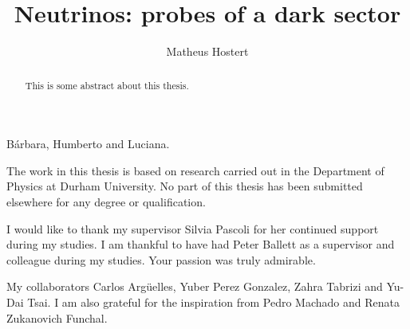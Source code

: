\documentclass[twoside,openright,frontopenright]{ip3thesis}
\begin{document}
\title{Neutrinos: probes of a dark sector}
\subtitle{}
\author{Matheus Hostert}
\maketitlepage*

\begin{abstract}
%
	This is some abstract about this thesis.
%
\end{abstract}


\begin{dedication*}
%
B\'arbara, Humberto and Luciana.
%
\end{dedication*}

\disableprotrusion
\tableofcontents*
\listoffigures
\listoftables
\enableprotrusion

\begin{declaration*}
%
	The work in this thesis is based on research carried out in the Department of
	Physics at Durham University. No part of this thesis has been
	submitted elsewhere for any degree or qualification.
%
\end{declaration*}

\begin{acknowledgements*}
%
	I would like to thank my supervisor Silvia Pascoli for her continued support during my studies. I am thankful to have had Peter Ballett as a supervisor and colleague during my studies. Your passion was truly admirable. 
		
%
	My collaborators Carlos Arg\"uelles, Yuber Perez Gonzalez, Zahra Tabrizi and Yu-Dai Tsai. I am also grateful for the inspiration from  Pedro Machado and Renata Zukanovich Funchal.
\end{acknowledgements*}



\cleardoublepage
\end{document}
